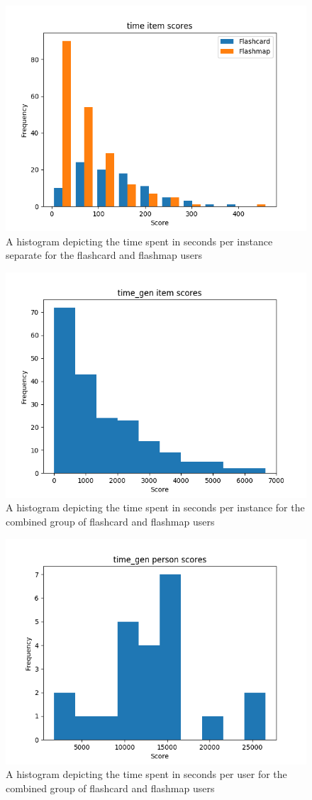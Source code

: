 \begin{figure}
    \centering
    \includegraphics[width=.7\textwidth]{img/time_diff.png}
    \caption{A histogram depicting the time spent in seconds per instance separate for the flashcard and flashmap users}
    \label{fig:time_diff}
\end{figure}

\begin{figure}
    \centering
    \includegraphics[width=.7\textwidth]{img/time_gen_diff.png}
    \caption{A histogram depicting the time spent in seconds per instance for the combined group of flashcard and flashmap users} 
    \label{fig:time_gen_diff}
\end{figure}
\begin{figure}
    \centering
    \includegraphics[width=.7\textwidth]{img/time_gen_abil.png}
    \caption{A histogram depicting the time spent in seconds per user for the combined group of flashcard and flashmap users}
    \label{fig:time_gen_abil}
\end{figure}

